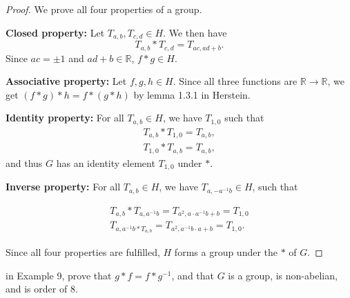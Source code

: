 \documentclass[addpoints, 11pt]{exam}
\newcommand*{\R}{\mathbb{R}}
\newenvironment{question}[1]{\smallskip\noindent\color{crimson}{\bf Question #1.}}{}
\begin{document}
\begin{proof}
    We prove all four properties of a group.
    
    \textbf{Closed property:} Let $T_{a, b}, T_{c, d} \in H$. We then have
    \[
        T_{a, b} * T_{c, d} = T_{ac, ad + b}.
    \]
    Since $ac = \pm 1$ and $ad + b \in \R$, $f * g \in H$.

    \textbf{Associative property:} Let $f,g,h \in H$. Since all three functions are $\R \rightarrow \R$, we get $(f * g) * h = f * (g * h)$ by lemma 1.3.1 in Herstein.

    \textbf{Identity property:} For all $T_{a, b} \in H$, we have $T_{1, 0}$ such that
    \begin{gather*}
        T_{a, b} * T_{1, 0} = T_{a, b}, \\
        T_{1, 0} * T_{a, b} = T_{a, b},
    \end{gather*}
    and thus $G$ has an identity element $T_{1, 0}$ under $*$.

    \textbf{Inverse property:} For all $T_{a, b} \in H$, we have $T_{a, -a^{-1}b} \in H$, such that 

    \begin{gather*}
        T_{a, b} * T_{a, a^{-1}b} = T_{a^2, a \cdot a^{-1}b + b} = T_{1, 0} \\
       T_{a, a^{-1}b * T_{a, b}}  = T_{a^2, a^{-1}b \cdot a + b} = T_{1, 0}.
    \end{gather*}

    Since all four properties are fulfilled, $H$ forms a group under the $*$ of $G$.
\end{proof}

\newpage

\begin{question}{2.1.5}
    in Example 9, prove that $g * f = f * g^{-1}$, and that $G$ is a group, is non-abelian, and is order of $8$.
\end{question}
\end{document}
